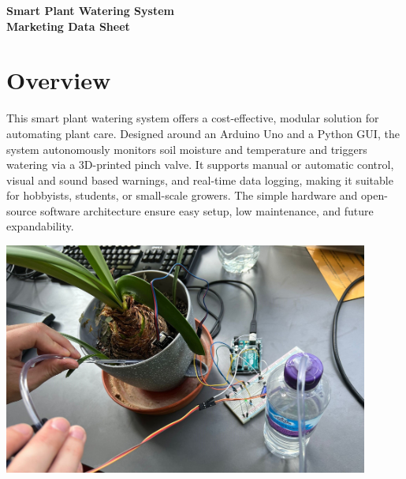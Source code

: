 \documentclass[a4paper,11pt]{article}
\begin{document}
\begin{center}
    {\Huge \textbf{Smart Plant Watering System}}\\[0.5em]
    \textbf{Marketing Data Sheet}
\end{center}
\vspace{-1.5em}

\titleformat{\section}[block]{\Large\bfseries\filcenter}{}{1em}{}
\titleformat{\subsection}[block]{\large\bfseries\filcenter}{}{1em}{}

\section*{Overview}
This smart plant watering system offers a cost-effective, 
modular solution for automating plant care. 
Designed around an Arduino Uno and a Python GUI, 
the system autonomously monitors soil moisture and temperature and 
triggers watering via a 3D-printed pinch valve. 
It supports manual or automatic control, visual and sound based warnings, 
and real-time data logging, making it suitable for 
hobbyists, students, or small-scale growers. 
The simple hardware and open-source software architecture ensure easy setup, 
low maintenance, and future expandability.

\vspace{1em}
\begin{center}
    \includegraphics[width=0.9\textwidth]{Images/Setup.jpg}
\end{center}
\end{document}
